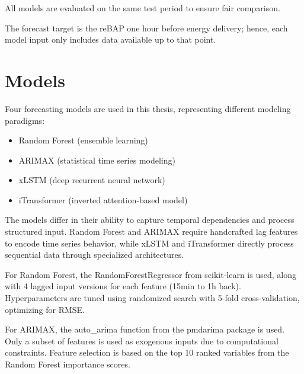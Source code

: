 \documentclass[class=scrbook, crop=false]{standalone}
\begin{document}
All models are evaluated on the same test period to ensure fair comparison. 

The forecast target is the reBAP one hour before energy delivery; hence, each model input only includes data available up to that point.






\section{Models}
\label{Section::Models}

Four forecasting models are used in this thesis, representing different modeling paradigms:
\begin{itemize}
\item Random Forest (ensemble learning)
\item ARIMAX (statistical time series modeling)
\item xLSTM (deep recurrent neural network)
\item iTransformer (inverted attention-based model)
\end{itemize}

The models differ in their ability to capture temporal dependencies and process structured input. Random Forest and ARIMAX require handcrafted lag features to encode time series behavior, while xLSTM and iTransformer directly process sequential data through specialized architectures.

For Random Forest, the RandomForestRegressor from scikit-learn is used, along with 4 lagged input versions for each feature (15min to 1h back). Hyperparameters are tuned using randomized search with 5-fold cross-validation, optimizing for RMSE.

For ARIMAX, the auto\_arima function from the pmdarima package is used. Only a subset of features is used as exogenous inputs due to computational constraints. Feature selection is based on the top 10 ranked variables from the Random Forest importance scores.
\end{document}
